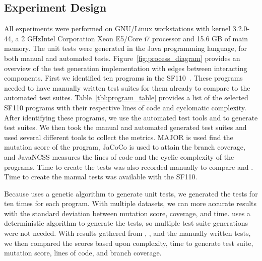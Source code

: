 
\subsection{Experiment Design}


All experiments were performed on GNU/Linux workstations with kernel 3.2.0-44, a 2 GHzIntel Corporation Xeon E5/Core i7
processor and  15.6 GB of main memory. The unit tests were generated in the Java programming language, for both manual
and automated tests. Figure~\ref{fig:process_diagram}  provides an overview of the test generation implementation with
edges between interacting components. First we identified ten programs
in the SF110~\cite{fraser:2012}. These
programs needed to have manually written test suites for them already to compare to the automated test suites.
Table~\ref{tbl:program_table} provides a list of the selected SF110 programs with their respective lines of code and
cyclomatic complexity.  After identifying these programs, we use the automated test tools \evo and \codepro to
generate test suites. We then took the manual and automated generated test suites and used several different tools to
collect the metrics. MAJOR is used find the mutation score of the program, JaCoCo is used to attain the branch coverage,
and JavaNCSS measures the lines of code and the cyclic complexity of the programs. Time to create the tests was also
recorded manually to compare \evo and \codepro. Time to create the manual tests was available with the SF110.

Because \evo uses a genetic algorithm to generate unit tests, we generated the tests for \evo ten times for each program. With multiple datasets, we can more accurate results with the standard deviation between mutation score, coverage, and time. \codepro uses a deterministic algorithm to generate the tests, so multiple test suite generations were not needed. With results gathered from \evo, \codepro, and the manually written tests, we then compared the scores based upon complexity, time to generate test suite, mutation score, lines of code, and branch coverage.


